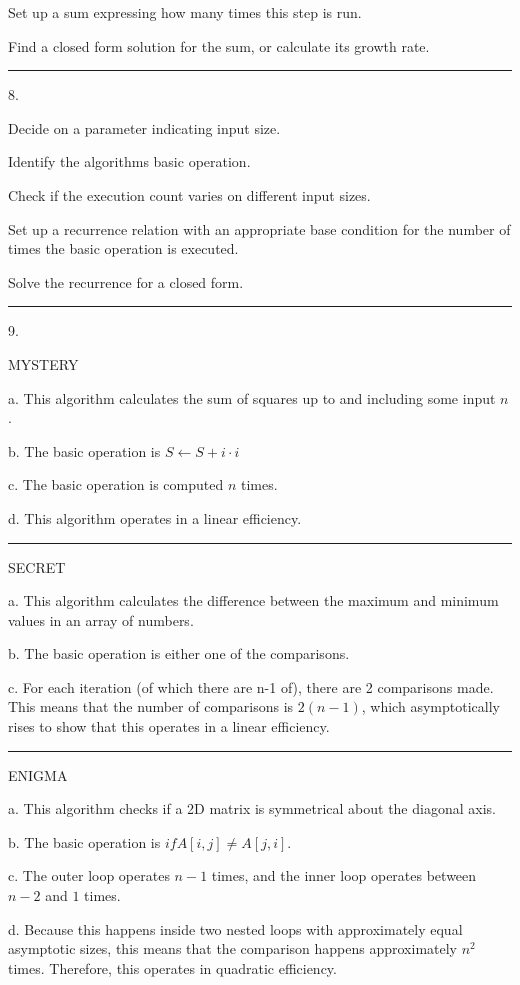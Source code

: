 \documentclass{article}
\begin{document}
Set up a sum expressing how many times this step is run. 

Find a closed form solution for the sum, or calculate its growth rate. 

\noindent\rule{8cm}{0.4pt}


8. 

Decide on a parameter indicating input size. 

Identify the algorithms basic operation. 

Check if the execution count varies on different input sizes. 

Set up a recurrence relation with an appropriate base condition for the number of times the basic operation is executed. 

Solve the recurrence for a closed form. 


\noindent\rule{8cm}{0.4pt}


9. 

MYSTERY

a. This algorithm calculates the sum of squares up to and including some input $n$. 

b. The basic operation is $S \leftarrow S + i\cdot i$

c. The basic operation is computed $n$ times. 

d. This algorithm operates in a linear efficiency.

\noindent\rule{2cm}{0.4pt}

SECRET

a. This algorithm calculates the difference between the maximum and minimum values in an array of numbers. 

b. The basic operation is either one of the comparisons. 

c. For each iteration (of which there are n-1 of), there are 2 comparisons made. This means that the number of comparisons is $2(n-1)$, which asymptotically rises to show that this operates in a linear efficiency. 

\noindent\rule{2cm}{0.4pt}

ENIGMA

a. This algorithm checks if a 2D matrix is symmetrical about the diagonal axis. 

b. The basic operation is $if A[i,j] \neq A[j,i]$. 

c. The outer loop operates $n-1$ times, and the inner loop operates between $n-2$ and $1$ times. 

d.  Because this happens inside two nested loops with approximately equal asymptotic sizes, this means that the comparison happens approximately $n^2$ times. Therefore, this operates in quadratic efficiency. 
\end{document}
